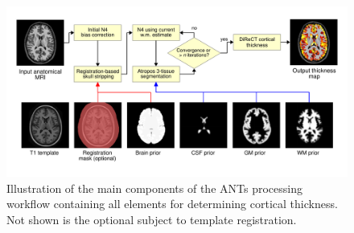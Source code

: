 %
%



\begin{figure}
  \centering
  \includegraphics[width=170mm]{figs/Kapowski_pipeline2.pdf}
  \caption{Illustration of the main components of the ANTs processing 
  workflow containing all elements for determining cortical thickness. 
  Not shown is the optional subject to template registration.}
  \label{fig:pipeline}
\end{figure}

